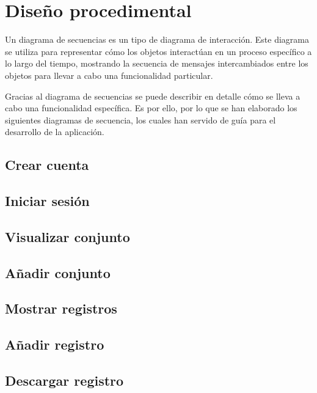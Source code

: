 \section{Diseño procedimental}

Un diagrama de secuencias es un tipo de diagrama de interacción. Este diagrama se utiliza para representar cómo los objetos interactúan en un proceso específico a lo largo del tiempo, mostrando la secuencia de mensajes intercambiados entre los objetos para llevar a cabo una funcionalidad particular. \cite{Booch1998}

Gracias al diagrama de secuencias se puede describir en detalle cómo se lleva a cabo una funcionalidad específica. Es por ello, por lo que se han elaborado los siguientes diagramas de secuencia, los cuales han servido de guía para el desarrollo de la aplicación.

\subsection{Crear cuenta}

\subsection{Iniciar sesión}

\subsection{Visualizar conjunto}

\subsection{Añadir conjunto}

\subsection{Mostrar registros}

\subsection{Añadir registro}

\subsection{Descargar registro}


